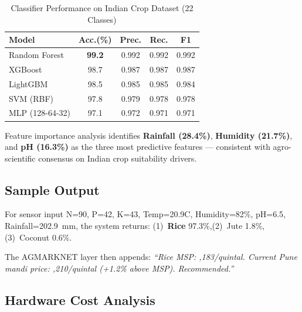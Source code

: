 \documentclass[10pt,twocolumn]{article}
\begin{document}
\begin{table}[htbp]
\caption{Classifier Performance on Indian Crop Dataset (22 Classes)}
\centering\small
\begin{tabular}{lcccc}
\toprule
\textbf{Model} & \textbf{Acc.(\%)} & \textbf{Prec.} & \textbf{Rec.} & \textbf{F1} \\
\midrule
Random Forest   & \textbf{99.2} & 0.992 & 0.992 & 0.992 \\
XGBoost         & 98.7          & 0.987 & 0.987 & 0.987 \\
LightGBM        & 98.5          & 0.985 & 0.985 & 0.984 \\
SVM (RBF)       & 97.8          & 0.979 & 0.978 & 0.978 \\
MLP (128-64-32) & 97.1          & 0.972 & 0.971 & 0.971 \\
\bottomrule
\end{tabular}
\label{tab:results}
\end{table}

Feature importance analysis identifies \textbf{Rainfall (28.4\%)}, \textbf{Humidity (21.7\%)}, and \textbf{pH (16.3\%)} as the three most predictive features --- consistent with agro-scientific consensus on Indian crop suitability drivers.

\subsection{Sample Output}

For sensor input N=90, P=42, K=43, Temp=20.9\textdegree C, Humidity=82\%, pH=6.5, Rainfall=202.9~mm, the system returns:
(1)~\textbf{Rice} 97.3\%,\quad (2)~Jute 1.8\%,\quad (3)~Coconut 0.6\%.

The AGMARKNET layer then appends: \textit{``Rice MSP: ,183/quintal. Current Pune mandi price: ,210/quintal (+1.2\% above MSP). Recommended.''}

\subsection{Hardware Cost Analysis}
\end{document}

